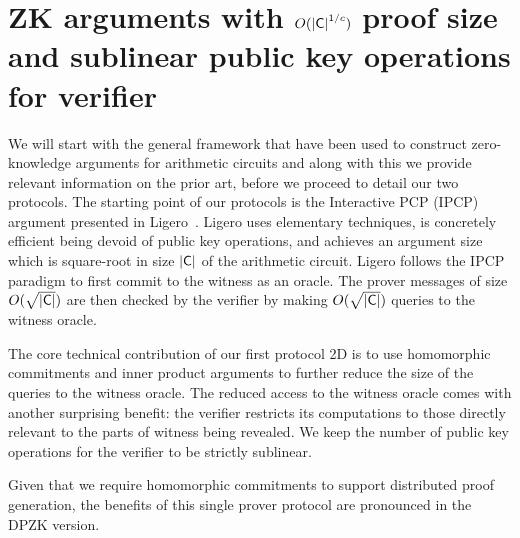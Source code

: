 \section{ZK arguments with $O(\mathsf{|C|}^{1/c})$ proof size and sublinear public key operations for verifier}
We will start with the general framework that have been used to construct zero-knowledge arguments for arithmetic circuits and along with this we provide relevant information on the prior art, before we proceed to detail our two protocols.
The starting point of our protocols is the Interactive PCP (IPCP) argument presented in Ligero~\cite{ligero}.
Ligero uses elementary techniques, is concretely
efficient being devoid of public key operations, and achieves an argument
size which is square-root in size $\mathsf{|C|}$ of the arithmetic circuit. Ligero follows the IPCP paradigm
to first commit to the witness as an oracle. The prover messages of size $O(\sqrt{\mathsf{|C|}})$ are then checked by the verifier by making $O(\sqrt{\mathsf{|C|}})$ queries to the witness oracle.

The core technical
contribution of our first protocol \name2D{} is to use homomorphic commitments and inner product arguments to 
further reduce the size of the queries to the witness oracle. The
reduced access to the witness oracle comes with another surprising benefit: the
verifier restricts its computations to those directly relevant to the parts of
witness being revealed. %
 We keep the number of public key operations for the
verifier to be strictly sublinear.

Given that we require homomorphic commitments to support distributed proof generation,
the benefits of this single prover protocol are pronounced in the DPZK version.
    
